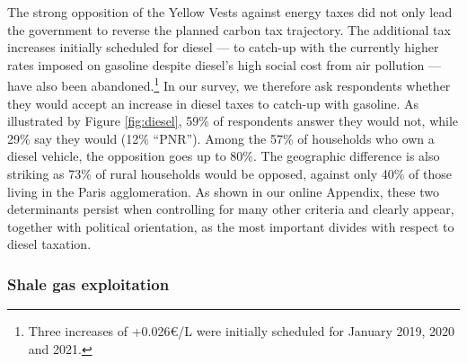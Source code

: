 \documentclass[english,5p,authoryear]{elsarticle}
\begin{document}
The strong opposition of the Yellow Vests against energy taxes did not only lead the government to reverse the planned carbon tax trajectory. The additional tax increases initially scheduled for diesel --- to catch-up with the currently higher rates imposed on gasoline despite diesel's high social cost from air pollution  --- have also been abandoned.\footnote{Three increases of +0.026\euro{}/L were initially scheduled for January 2019, 2020 and 2021.}  In our survey, we therefore ask respondents whether they would accept an increase in diesel taxes to catch-up with gasoline. As illustrated by Figure \ref{fig:diesel}, 59\% of respondents answer they would not, while 29\% say they would (12\% ``PNR''). Among the 57\% of households who own a diesel vehicle, the opposition goes up to 80\%. The geographic difference is also striking as 73\% of rural households would be opposed, against only 40\% of those living in the Paris agglomeration. As shown in our online Appendix, these two determinants persist when controlling for many other criteria and clearly appear, together with political orientation, as the most important divides with respect to diesel taxation.


        \subsubsection{Shale gas exploitation}
\end{document}
